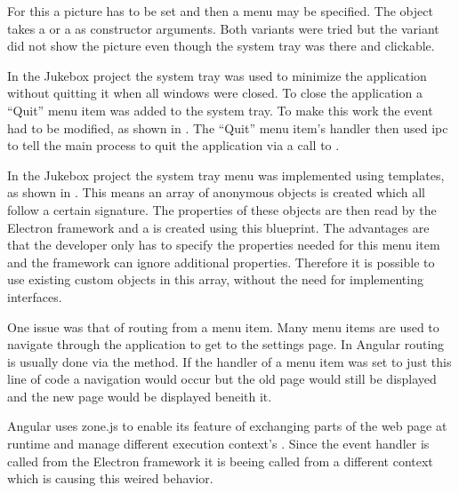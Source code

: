 For this a picture has to be set and then a menu may be specified. The  object takes a  or a  as constructor arguments. Both variants were tried but the  variant did not show the picture even though the system tray was there and clickable.


In the Jukebox project the system tray was used to minimize the application without quitting it when all windows were closed. To close the application a \enquote{Quit} menu item was added to the system tray. To make this work the  event had to be modified, as shown in . The \enquote{Quit} menu item's  handler then used \gls{ipc} to tell the main process to quit the application via a call to .


In the Jukebox project the system tray menu was implemented using templates, as shown in . This means an array of anonymous objects is created which all follow a certain signature. The properties of these objects are then read by the Electron framework and a  is created using this blueprint. The advantages are that the developer only has to specify the properties needed for this menu item and the framework can ignore additional properties. Therefore it is possible to use existing custom objects in this array, without the need for implementing interfaces.


One issue was that of routing from a menu item. Many menu items are used to navigate through the application \zB to get to the settings page. In Angular routing is usually done via the  method. If the  handler of a menu item was set to just this line of code a navigation would occur but the old page would still be displayed and the new page would be displayed beneith it.

Angular uses zone.js to enable its  feature of exchanging parts of the web page at runtime and manage different execution context's \cite{zoneJS}. Since the  event handler is called from the Electron framework it is beeing called from a different context which is causing this weired behavior.

